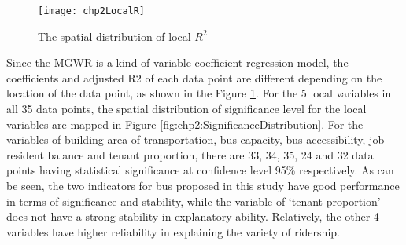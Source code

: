 \begin{figure}[htbp]
	\centering
	\texttt{[image: chp2LocalR]}
	\caption{The spatial distribution of local $R^2$}
	\label{fig:chp2:LocalR}
\end{figure}

%
Since the MGWR is a kind of variable coefficient regression model, the coefficients and adjusted R2 of each data point are different depending on the location of the data point, as shown in the Figure \ref{fig:chp2:LocalR}. For the 5 local variables in all 35 data points, the spatial distribution of significance level for the local variables are mapped in Figure \ref{fig:chp2:SignificanceDistribution}. For the variables of building area of transportation, bus capacity, bus accessibility, job-resident balance and tenant proportion, there are 33, 34, 35, 24 and 32 data points having statistical significance at confidence level 95\% respectively. As can be seen, the two indicators for bus proposed in this study have good performance in terms of significance and stability, while the variable of ‘tenant proportion’ does not have a strong stability in explanatory ability. Relatively, the other 4 variables have higher reliability in explaining the variety of ridership.




